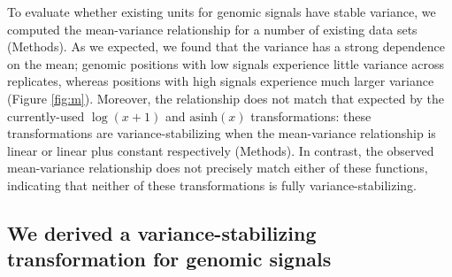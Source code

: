 \documentclass[11pt]{article}
\begin{document}
To evaluate whether existing units for genomic signals have stable variance, we computed the mean-variance relationship for a number of existing data sets (Methods).
As we expected, we found that the variance has a strong dependence on the mean; genomic positions with low signals experience little variance across replicates, whereas positions with high signals experience much larger variance (Figure \ref{fig:m}). 
Moreover, the relationship does not match that expected by the currently-used $\log(x+1)$ and $\text{asinh}(x)$ transformations: these transformations are variance-stabilizing when the mean-variance relationship is linear or linear plus constant respectively (Methods).
In contrast, the observed mean-variance relationship does not precisely match either of these functions, indicating that neither of these transformations is fully variance-stabilizing. 


\subsection{We derived a variance-stabilizing transformation for genomic signals}
\end{document}
